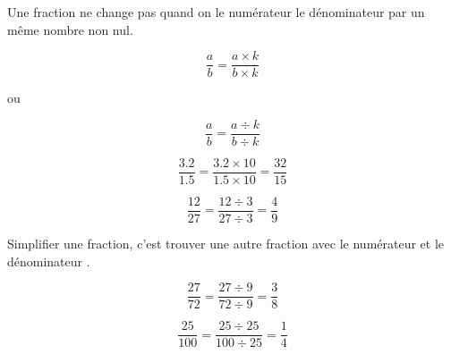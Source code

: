 \begin{myprop}
	Une fraction ne change pas quand on  le numérateur  le dénominateur par un même nombre non nul.
	
	\begin{multicols}{3}
		\begin{equation*}
		\dfrac{a}{b} = \dfrac{a \times k}{b \times k} 
		\end{equation*}
		
		 \begin{center}
		 	ou
		 \end{center}
		
		\begin{equation*}
		\dfrac{a}{b} = \dfrac{a \div k}{b \div k} 
		\end{equation*}	
	\end{multicols}	
	
\end{myprop}

\begin{myex}
	
	\begin{multicols}{2}
		
	\begin{equation*}
		\dfrac{\num{3.2}}{\num{1.5}} = \dfrac{\num{3.2} \times 10 }{\num{1.5} \times 10 } = \dfrac{\num{32}}{\num{15}}
	\end{equation*}
	
	
	\begin{equation*}
		\dfrac{\num{12}}{\num{27}} = \dfrac{\num{12} \div 3 }{\num{27} \div 3 } = \dfrac{\num{4}}{\num{9}} 
	\end{equation*}
	\end{multicols}
\end{myex}

\begin{mydef}
	Simplifier une fraction, c'est trouver une autre fraction  avec le numérateur et le dénominateur .
\end{mydef}

\begin{myex}
	\begin{multicols}{2}
		\begin{equation*}
			\dfrac{\num{27}}{\num{72}} = \dfrac{\num{27} \div 9 }{\num{72} \div 9 } = \dfrac{\num{3}}{\num{8}} 
		\end{equation*}	
	
		\begin{equation*}
			\dfrac{\num{25}}{\num{100}} = \dfrac{\num{25} \div 25 }{\num{100} \div 25 } = \dfrac{\num{1}}{\num{4}} 
		\end{equation*}	
	\end{multicols}
\end{myex}
	